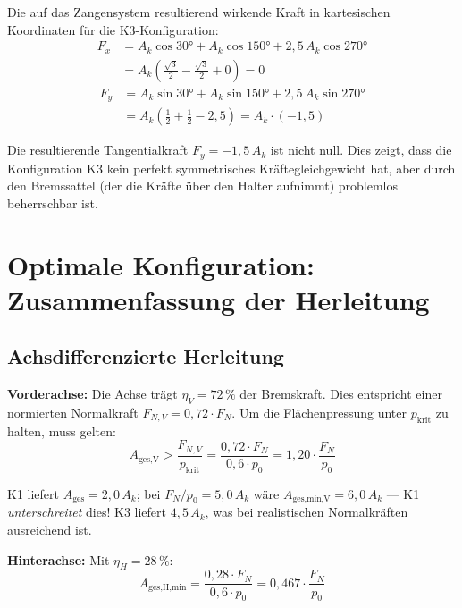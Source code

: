 ﻿\documentclass[12pt,a4paper]{article}
\theoremstyle{definition}
\begin{document}
Die auf das Zangensystem resultierend wirkende Kraft in kartesischen
Koordinaten für die K3-Konfiguration:
\begin{align}
  F_x &= A_k \cos 30 ° + A_k \cos 150 ° + 2{,}5\,A_k \cos 270 ° \\
      &= A_k \!\left(\tfrac{\sqrt{3}}{2} - \tfrac{\sqrt{3}}{2} + 0\right) = 0
      \label{eq:Fx_K3}
\end{align}
\begin{align}
  F_y &= A_k \sin 30 ° + A_k \sin 150 ° + 2{,}5\,A_k \sin 270 ° \\
      &= A_k \!\left(\tfrac{1}{2} + \tfrac{1}{2} - 2{,}5\right)
       = A_k \cdot (-1{,}5)
      \label{eq:Fy_K3}
\end{align}

Die resultierende Tangentialkraft $F_y = -1{,}5\,A_k$ ist nicht null.
Dies zeigt, dass die Konfiguration K3 kein perfekt symmetrisches
Kräftegleichgewicht hat, aber durch den Bremssattel (der die Kräfte
über den Halter aufnimmt) problemlos beherrschbar ist.

\section{Optimale Konfiguration: Zusammenfassung der Herleitung}

\subsection{Achsdifferenzierte Herleitung}

\textbf{Vorderachse:}  Die Achse trägt $\eta_V = 72\,\%$ der Bremskraft.
Dies entspricht einer normierten Normalkraft
$F_{N,V} = 0{,}72 \cdot F_N$.  Um die Flächenpressung unter
$p_{\text{krit}}$ zu halten, muss gelten:
\begin{equation}
  A_{\text{ges,V}} > \frac{F_{N,V}}{p_{\text{krit}}}
  = \frac{0{,}72 \cdot F_N}{0{,}6 \cdot p_0}
  = 1{,}20 \cdot \frac{F_N}{p_0}
  \label{eq:A_V_min}
\end{equation}

K1 liefert $A_{\text{ges}} = 2{,}0\,A_k$; bei $F_N/p_0 = 5{,}0\,A_k$
wäre $A_{\text{ges,min,V}} = 6{,}0\,A_k$ --- K1 \emph{unterschreitet} dies!
K3 liefert $4{,}5\,A_k$, was bei realistischen Normalkräften ausreichend ist.

\textbf{Hinterachse:}  Mit $\eta_H = 28\,\%$:
\begin{equation}
  A_{\text{ges,H,min}} = \frac{0{,}28 \cdot F_N}{0{,}6 \cdot p_0}
  = 0{,}467 \cdot \frac{F_N}{p_0}
  \label{eq:A_H_min}
\end{equation}
\end{document}
